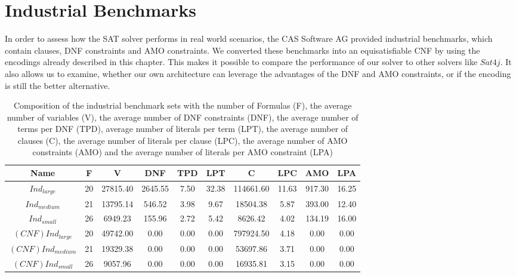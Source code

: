 \section{Industrial Benchmarks}

In order to assess how the SAT solver performs in real world scenarios, the CAS Software AG provided industrial benchmarks, which contain clauses, DNF constraints and AMO constraints. We converted these benchmarks into an equisatisfiable CNF by using the encodings already described in this chapter. This makes it possible to compare the performance of our solver to other solvers like $Sat4j$. It also allows us to examine, whether our own architecture can leverage the advantages of the DNF and AMO constraints, or if the encoding is still the better alternative.

\begin{table}[!htb]
\centering
\caption[Composition of the industrial benchmark sets]{Composition of the industrial benchmark sets with the number of Formulas (F), the average number of variables (V), the average number of DNF constraints (DNF), the average number of terms per DNF (TPD), average number of literals per term (LPT), the average number of clauses (C), the average number of literals per clause (LPC), the average number of AMO constraints (AMO) and the average number of literals per AMO constraint (LPA)}
\label{tab:industrialBenchmarks}
\begin{adjustbox}{max width=\textwidth}
\begin{tabular}{|c|c|c|c|c|c|c|c|c|c|}
\hline
Name & F & V & DNF & TPD & LPT & C & LPC & AMO & LPA \\ 
\hline
$Ind_{large}$ & 20 & 27815.40 & 2645.55 & 7.50 & 32.38 & 114661.60 & 11.63 & 917.30 & 16.25 \\ 
 \hline 
$Ind_{medium}$ & 21 & 13795.14 & 546.52 & 3.98 & 9.67 & 18504.38 & 5.87 & 393.00 & 12.40 \\ 
 \hline 
$Ind_{small}$ & 26 & 6949.23 & 155.96 & 2.72 & 5.42 & 8626.42 & 4.02 & 134.19 & 16.00 \\ 
 \hline 
$(CNF)Ind_{large}$ & 20 & 49742.00 & 0.00 & 0.00 & 0.00 & 797924.50 & 4.18 & 0.00 & 0.00 \\ 
 \hline 
$(CNF)Ind_{medium}$& 21 & 19329.38 & 0.00 & 0.00 & 0.00 & 53697.86 & 3.71 & 0.00 & 0.00 \\ 
 \hline 
$(CNF)Ind_{small}$ & 26 & 9057.96 & 0.00 & 0.00 & 0.00 & 16935.81 & 3.15 & 0.00 & 0.00 \\ 
 \hline 
\end{tabular}
\end{adjustbox}
\end{table}

